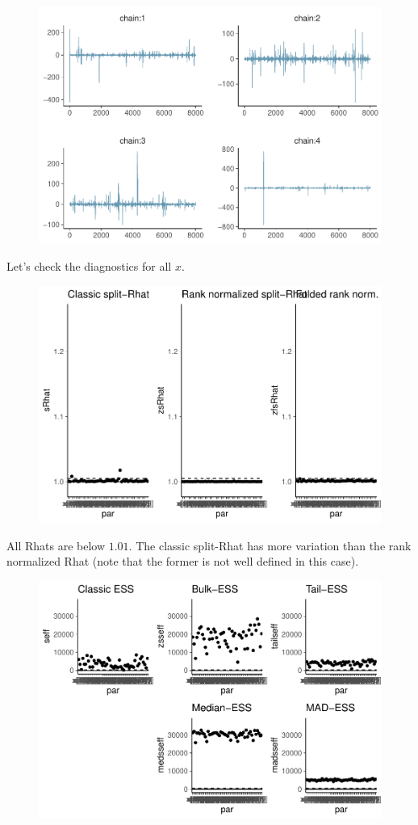 \documentclass[american,]{article}
\begin{document}
\begin{figure}[tp]
  \centering
  \includegraphics[width=0.6\linewidth]{graphics/trace-fit-nom-td20l-1.pdf}
\end{figure}

Let's check the diagnostics for all \(x\).

\begin{figure}[tp]
  \centering
  \includegraphics[width=0.6\linewidth]{graphics/rhat-fit-nom-td20l-1.pdf}
\end{figure}

All Rhats are below \(1.01\). The classic split-Rhat has more variation
than the rank normalized Rhat (note that the former is not well defined
in this case).

\begin{figure}[tp]
  \centering
  \includegraphics[width=0.6\linewidth]{graphics/ess-fit-nom-td20l-1.pdf}
\end{figure}
\end{document}
